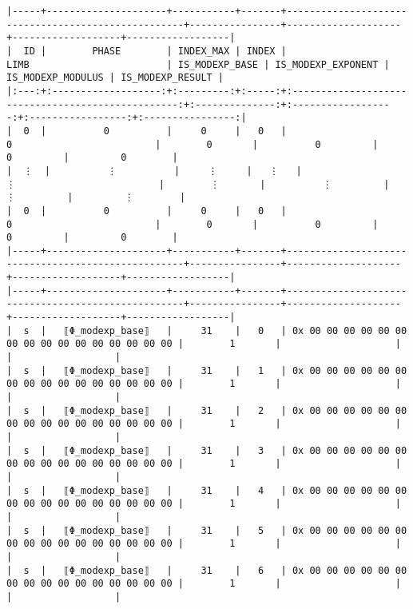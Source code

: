 \documentclass[varwidth=\maxdimen,margin=0.5cm,multi={verbatim}]{standalone}
\begin{document}
\begin{verbatim}
|-----+---------------------+-----------+-------+----------------------------------------------------+----------------+--------------------+-------------------+------------------|
|  ID |        PHASE        | INDEX_MAX | INDEX |                        LIMB                        | IS_MODEXP_BASE | IS_MODEXP_EXPONENT | IS_MODEXP_MODULUS | IS_MODEXP_RESULT |
|:---:+:-------------------:+:---------:+:-----:+:--------------------------------------------------:+:--------------:+:------------------:+:-----------------:+:----------------:|
|  0  |          0          |     0     |   0   |                          0                         |        0       |          0         |         0         |         0        |
|  ⋮  |          ⋮          |     ⋮     |   ⋮   |                          ⋮                         |        ⋮       |          ⋮         |         ⋮         |         ⋮        |
|  0  |          0          |     0     |   0   |                          0                         |        0       |          0         |         0         |         0        |
|-----+---------------------+-----------+-------+----------------------------------------------------+----------------+--------------------+-------------------+------------------|
|-----+---------------------+-----------+-------+----------------------------------------------------+----------------+--------------------+-------------------+------------------|
|  s  |   ⟦Φ_modexp_base⟧   |     31    |   0   | 0x 00 00 00 00 00 00 00 00 00 00 00 00 00 00 00 00 |        1       |                    |                   |                  |
|  s  |   ⟦Φ_modexp_base⟧   |     31    |   1   | 0x 00 00 00 00 00 00 00 00 00 00 00 00 00 00 00 00 |        1       |                    |                   |                  |
|  s  |   ⟦Φ_modexp_base⟧   |     31    |   2   | 0x 00 00 00 00 00 00 00 00 00 00 00 00 00 00 00 00 |        1       |                    |                   |                  |
|  s  |   ⟦Φ_modexp_base⟧   |     31    |   3   | 0x 00 00 00 00 00 00 00 00 00 00 00 00 00 00 00 00 |        1       |                    |                   |                  |
|  s  |   ⟦Φ_modexp_base⟧   |     31    |   4   | 0x 00 00 00 00 00 00 00 00 00 00 00 00 00 00 00 00 |        1       |                    |                   |                  |
|  s  |   ⟦Φ_modexp_base⟧   |     31    |   5   | 0x 00 00 00 00 00 00 00 00 00 00 00 00 00 00 00 00 |        1       |                    |                   |                  |
|  s  |   ⟦Φ_modexp_base⟧   |     31    |   6   | 0x 00 00 00 00 00 00 00 00 00 00 00 00 00 00 00 00 |        1       |                    |                   |                  |

\end{verbatim}
\end{document}
